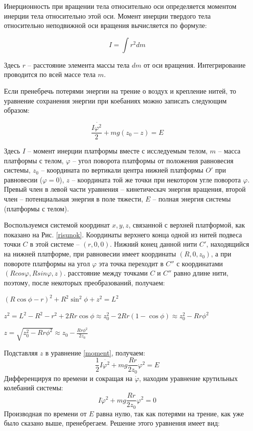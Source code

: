 \documentclass[a4paper,14pt]{extarticle}
\begin{document}
	\par Инерционность при вращении тела относительно оси определяется моментом инерции тела относительно этой оси. Момент инерции твердого тела относительно неподвижной оси вращения вычисляется по формуле:
	
	\begin{equation}
		I = \int r^2 dm
	\end{equation}
	
	Здесь $r$ -- расстояние элемента массы тела $dm$ от оси вращения. Интегрирование проводится по всей массе тела $m$.
	
	Если пренебречь потерями энергии на трение о воздух и крепление нитей, то уравнение сохранения энергии при коебаниях можно записать следующим образом:
	
	\begin{equation}\label{moment}
		\frac{I \dot{\varphi^2}}{2} + mg(z_0-z) = E
	\end{equation}
	
	Здесь $I$ -- момент инерции платформы вместе с исследуемым телом, $m$ -- масса платформы с телом, $\varphi$ -- угол поворота платформы от положения равновесия системы, $z_0$ -- координата по вертикали центра нижней платформы $O'$  при равновесии ($\varphi = 0$), $z$ -- координата той же точки при некотором угле поворота $\varphi$. Превый член в левой части уравнения -- кинетическач энергия вращения, второй член -- потенциальная энергия в поле тяжести, $E$ -- полная энергия системы (платформы с телом).
	
	Воспользуемся системой координат $x, y, z$, связанной с верхней платформой, как показано на Рис. \ref{risunok}. Координаты верхнего конца одной из нитей подвеса точки $C$ в этой системе -- $(r, 0, 0)$. Нижний конец данной нити $C'$, находящийся на нижней платформе, при равновесии имеет координаты $(R, 0, z_0)$, а при повороте платформы на угол $\varphi$ эта точка переходит в $C''$ с координатами $(Rcos\varphi, Rsin\varphi, z)$. расстояние между точками $C$ и $C''$ равно длине нити, поэтому, после некоторых преобразований, получаем: 
	
	\begin{center}
			$ (R\cos\phi - r)^2 + R^2\sin^2\phi + z^2 = L^2 $
			
			$ z^2 = L^2 - R^2 - r^2 + 2Rr\cos\phi \approx z^2_{0} - 2Rr(1 - \cos\phi) \approx z^2_{0} - Rr\phi^2 $
			
			$ z = \sqrt{z^2_{0} - Rr\phi^2} \approx z_{0} - \frac{Rr\phi^2}{2z_{0}} $
	\end{center}
	Подставляя $z$ в уравнение \eqref{moment}, получаем:
	\begin{equation}
		\frac{1}{2}I\dot{\varphi^2} + mg \frac{Rr}{2z_0}\varphi^2 = E
	\end{equation}
	Дифференцируя по времени и сокращая на $\dot\varphi$, находим уравнение крутильных колебаний системы:
	\begin{equation}
		I\ddot\varphi^2 + mg\frac{Rr}{2z_0}\varphi^2 = 0
	\end{equation}
	Производная по времени от $E$ равна нулю, так как потерями на трение, как уже было сказано выше, пренебрегаем.
	Решение этого уравнения имеет вид:
	
\end{document}
